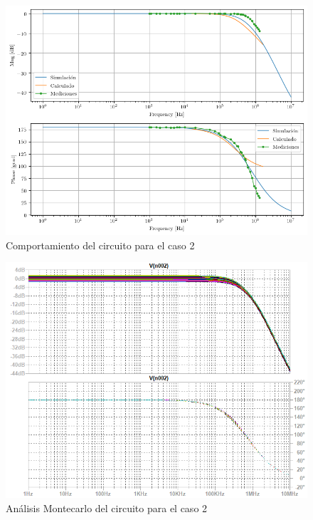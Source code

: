 \begin{figure}[H]
\begin{centering}
\includegraphics[scale=0.5]{../Ex1/iA/Resources1a/H2}
\par\end{centering}
\caption{Comportamiento del circuito para el caso 2}
\label{1_a_2_b}
\end{figure}

\begin{figure}[H]
\begin{centering}
\includegraphics[scale=0.5]{../Ex1/iA/Resources1a/montecarlo1a_2}
\par\end{centering}
\caption{Análisis Montecarlo del circuito para el caso 2}

\end{figure}


